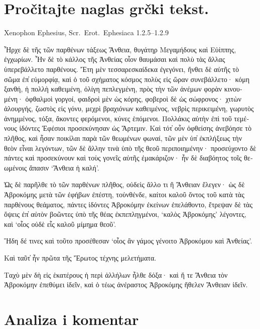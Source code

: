 
\section*{Pročitajte naglas grčki tekst.}

Xenophon Ephesius, Scr.\ Erot.\ Ephesiaca 1.2.5–1.2.9


\medskip


{\large

\begin{greek}

\noindent Ἦρχε δὲ τῆς τῶν παρθένων τάξεως Ἄνθεια, θυγάτηρ Μεγαμήδους καὶ Εὐίππης, ἐγχωρίων. Ἦν δὲ τὸ κάλλος τῆς Ἀνθείας οἷον θαυμάσαι καὶ πολὺ τὰς ἄλλας ὑπερεβάλλετο παρθένους. Ἔτη μὲν τεσσαρεσκαίδεκα ἐγεγόνει, ἤνθει δὲ αὐτῆς τὸ σῶμα ἐπ̓ εὐμορφίᾳ, καὶ ὁ τοῦ σχήματος κόσμος πολὺς εἰς ὥραν συνεβάλλετο· κόμη ξανθή, ἡ πολλὴ καθειμένη, ὀλίγη πεπλεγμένη, πρὸς τὴν τῶν ἀνέμων φορὰν κινουμένη· ὀφθαλμοὶ γοργοί, φαιδροὶ μὲν ὡς κόρης, φοβεροὶ δὲ ὡς σώφρονος· χιτὼν ἁλουργής, ζωστὸς εἰς γόνυ, μεχρὶ βραχιόνων καθειμένος, νεβρὶς περικειμένη, γωρυτὸς ἀνημμένος, τόξα, ἄκοντες φερόμενοι, κύνες ἑπόμενοι. Πολλάκις αὐτὴν ἐπὶ τοῦ τεμένους ἰδόντες Ἐφέσιοι προσεκύνησαν ὡς Ἄρτεμιν. Καὶ τότ̓ οὖν ὀφθείσης ἀνεβόησε τὸ πλῆθος, καὶ ἦσαν ποικίλαι παρὰ τῶν θεωμένων φωναί, τῶν μὲν ὑπ̓ ἐκπλήξεως τὴν θεὸν εἶναι λεγόντων, τῶν δὲ ἄλλην τινὰ ὑπὸ τῆς θεοῦ περιποιημένην· προσεύχοντο δὲ πάντες καὶ προσεκύνουν καὶ τοὺς γονεῖς αὐτῆς ἐμακάριζον· ἦν δὲ διαβόητος τοῖς θεωμένοις ἅπασιν `Ἄνθεια ἡ καλή'. 

Ὡς δὲ παρῆλθε τὸ τῶν παρθένων πλῆθος, οὐδεὶς ἄλλο τι ἢ Ἄνθειαν ἔλεγεν· ὡς δὲ Ἁβροκόμης μετὰ τῶν ἐφήβων ἐπέστη, τοὐνθένδε, καίτοι καλοῦ ὄντος τοῦ κατὰ τὰς παρθένους θεάματος, πάντες ἰδόντες Ἁβροκόμην ἐκείνων ἐπελάθοντο, ἔτρεψαν δὲ τὰς ὄψεις ἐπ̓ αὐτὸν βοῶντες ὑπὸ τῆς θέας ἐκπεπληγμένοι, `καλὸς Ἁβροκόμης' λέγοντες, καὶ `οἷος οὐδὲ εἷς καλοῦ μίμημα θεοῦ'.

Ἤδη δέ τινες καὶ τοῦτο προσέθεσαν `οἷος ἂν γάμος γένοιτο Ἁβροκόμου καὶ Ἀνθείας'.

Καὶ ταῦτ̓ ἦν πρῶτα τῆς Ἔρωτος τέχνης μελετήματα.

Ταχὺ μὲν δὴ εἰς ἑκατέρους ἡ περὶ ἀλλήλων ἦλθε δόξα· καὶ ἥ τε Ἄνθεια τὸν Ἁβροκόμην ἐπεθύμει ἰδεῖν, καὶ ὁ τέως ἀνέραστος Ἁβροκόμης ἤθελεν Ἄνθειαν ἰδεῖν.

\end{greek}

}


\section*{Analiza i komentar}


